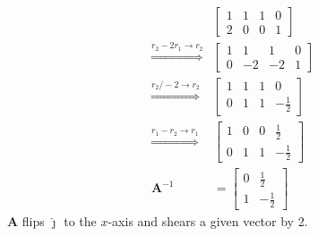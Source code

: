 \documentclass[]{article}
\numberwithin{equation}{section}
\begin{document}

\subsection{}

\begin{align}
	&\left[
	\begin{array}{cc|cc}
	1 & 1 & 1 & 0 \\
	2 & 0 & 0 & 1
	\end{array}
	\right] \\
	\overset{r_2 - 2r_1 \to r_2}{\Longrightarrow} &\left[
	\begin{array}{cc|cc}
	1 & 1 & 1 & 0 \\
	0 & -2 & -2 & 1
	\end{array}
	\right] \\
	\overset{r_2/-2 \to r_2}{\Longrightarrow} &\left[
	\begin{array}{cc|cc}
	1 & 1 & 1 & 0 \\
	0 & 1 & 1 & -\frac{1}{2}
	\end{array}
	\right] \\
	\overset{r_1 - r_2 \to r_1}{\Longrightarrow} &\left[
	\begin{array}{cc|cc}
	1 & 0 & 0 & \frac{1}{2} \\
	0 & 1 & 1 & -\frac{1}{2}
	\end{array}
	\right] \\
	\mathbf{A}^{-1} &= 
	\begin{bmatrix}
	0 & \frac{1}{2} \\
	1 & -\frac{1}{2}
	\end{bmatrix}
\end{align}
\(\mathbf{A}\) flips \(\hat{\jmath}\) to the \(x\)-axis and shears a given vector by 2. 

\subsection{}
\end{document}
